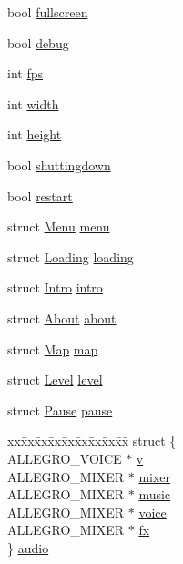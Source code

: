 \begin{DoxyCompactItemize}
\item 
bool \hyperlink{structGame_a026034417d95688ab99ba2e96e064b7f}{fullscreen}
\item 
bool \hyperlink{structGame_ad1a3eb5c2d99f8cb9c1f7eb91689af6d}{debug}
\item 
int \hyperlink{structGame_a28534ff51b7b2adc76bdd8894a750d0d}{fps}
\item 
int \hyperlink{structGame_a06b5a675d7c0f6a9b58d395872b1a4e7}{width}
\item 
int \hyperlink{structGame_aa6d1743c45de5558a0ca99078df85250}{height}
\item 
bool \hyperlink{structGame_a9a1d33be7ec00f87ede16b96bd2df312}{shuttingdown}
\item 
bool \hyperlink{structGame_aad2035c807bd99529d1a07e443e0016b}{restart}
\item 
struct \hyperlink{structMenu}{\-Menu} \hyperlink{structGame_ad120de2e84e2d857dd83fc1116176f21}{menu}
\item 
struct \hyperlink{structLoading}{\-Loading} \hyperlink{structGame_a496f71737460d24add0f426f7fbc90b9}{loading}
\item 
struct \hyperlink{structIntro}{\-Intro} \hyperlink{structGame_afcc0b09f19df8162100973a002509000}{intro}
\item 
struct \hyperlink{structAbout}{\-About} \hyperlink{structGame_a0f7f35de759c984c4b53c86fb0dcbd44}{about}
\item 
struct \hyperlink{structMap}{\-Map} \hyperlink{structGame_aaab875b9e556df53251db40341046cab}{map}
\item 
struct \hyperlink{structLevel}{\-Level} \hyperlink{structGame_aa258068886c6db9c88d73e07c7e114f2}{level}
\item 
struct \hyperlink{structPause}{\-Pause} \hyperlink{structGame_a3fe420d2d9b47cbdbb26d4f68bb5a0f0}{pause}
\item 
\begin{tabbing}
xx\=xx\=xx\=xx\=xx\=xx\=xx\=xx\=xx\=\kill
struct \{\\
\>ALLEGRO\_VOICE $\ast$ \hyperlink{structGame_ab27cb95bcd1591fec45317a1e9f5062d}{v}\\
\>ALLEGRO\_MIXER $\ast$ \hyperlink{structGame_ab8265074be4df5408a7c2fc1fb89dfc4}{mixer}\\
\>ALLEGRO\_MIXER $\ast$ \hyperlink{structGame_a49891173b349e56fcda6b0a0e39a47ee}{music}\\
\>ALLEGRO\_MIXER $\ast$ \hyperlink{structGame_acc651129cb9fafedf0588e229827c543}{voice}\\
\>ALLEGRO\_MIXER $\ast$ \hyperlink{structGame_adb4702bfcc1973de315ead6d683331b2}{fx}\\
\} \hyperlink{structGame_a08fa0fd8226d1c661bbdd069197fb690}{audio}\\

\end{tabbing}\end{DoxyCompactItemize}



